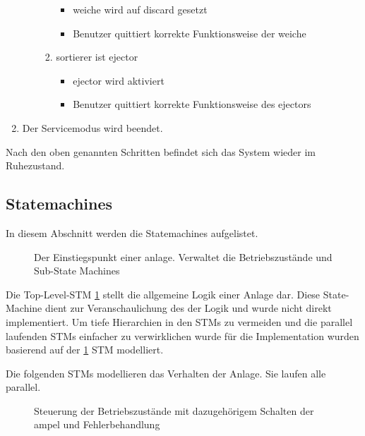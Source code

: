 \begin{enumerate}
\begin{enumerate}
\begin{enumerate}
\begin{itemize}
                \item \gls{weiche} wird auf \gls{discard} gesetzt
                \item Benutzer quittiert korrekte Funktionsweise der \gls{weiche}
            \end{itemize}
            \item \gls{sortierer} ist \gls{ejector}
            \begin{itemize}
                \item \Gls{ejector} wird aktiviert
                \item Benutzer quittiert korrekte Funktionsweise des \gls{ejector}s
            \end{itemize}
        \end{enumerate}
    \end{enumerate}
    \item Der Servicemodus wird beendet.
\end{enumerate}
Nach den oben genannten Schritten befindet sich das System wieder im Ruhezustand.


\subsection{Statemachines}\label{subsec:stm}
In diesem Abschnitt werden die Statemachines aufgelistet.

\begin{figure}
    \caption{Der Einstiegspunkt einer \gls{anlage}.
    Verwaltet die Betriebszustände und Sub-State Machines}
    \label{fig:stm_top_level}
\end{figure}

Die Top-Level-STM \ref{fig:stm_top_level} stellt die allgemeine Logik einer Anlage dar.
Diese State-Machine dient zur Veranschaulichung des der Logik und wurde nicht direkt implementiert.
Um tiefe Hierarchien in den STMs zu vermeiden und die parallel laufenden STMs einfacher zu verwirklichen wurde
für die Implementation wurden basierend auf der \ref{fig:stm_top_level} STM modelliert.

Die folgenden STMs modellieren das Verhalten der Anlage.
Sie laufen alle parallel.

\begin{figure}
    \caption{Steuerung der Betriebszustände mit dazugehörigem Schalten der \gls{ampel} und Fehlerbehandlung}
    \label{fig:stm_operation_manager}
\end{figure}

